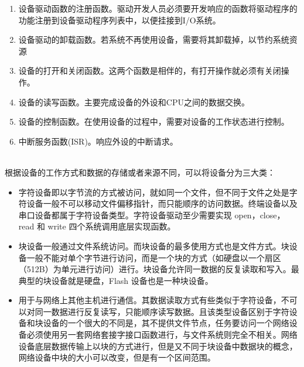 \begin{enumerate}
\item 设备驱动函数的注册函数。驱动开发人员必须要开发响应的函数将驱动程序的功能注册到设备驱动程序列表中，以便挂接到I/O系统。

\item 设备驱动的卸载函数。若系统不再使用设备，需要将其卸载掉，以节约系统资源

\item 设备的打开和关闭函数。这两个函数是相伴的，有打开操作就必须有关闭操作。

\item 设备的读写函数。主要完成设备的外设和CPU之间的数据交换。

\item 设备的控制函数。在使用设备的过程中，需要对设备的工作状态进行控制。

\item 中断服务函数(ISR)。响应外设的中断请求。
\end{enumerate}\\
根据设备的工作方式和数据的存储或者来源不同，可以将设备分为三大类：
\begin{itemize}
\item {}

	字符设备即以字节流的方式被访问，就如同一个文件，但不同于文件之处是字符设备一般不可以移动文件偏移指针，而只能顺序的访问数据。终端设备以及串口设备都属于字符设备类型。字符设备驱动至少需要实现 open，close，read 和 write 四个系统调用底层实现函数。

\item {}

	块设备一般通过文件系统访问。而块设备的最多使用方式也是文件方式。块设备一般不能对单个字节进行访问，而是一个块的方式（如硬盘以一个扇区（512B）为单元进行访问）进行。块设备允许同一数据的反复读取和写入。最典型的块设备就是硬盘，Flash 设备也是一种块设备。
	
\item {}

	用于与网络上其他主机进行通信。其数据读取方式有些类似于字符设备，不可以对同一数据进行反复读写，只能顺序读写数据。且该类型设备区别于字符设备和块设备的一个很大的不同是，其不提供文件节点，任务要访问一个网络设备必须使用另一套网络套接字接口函数进行，与文件系统则完全不相关。网络设备底层数据传输上以块的方式进行，但是又不同于块设备中数据块的概念，网络设备中块的大小可以改变，但是有一个区间范围。
	
\end{itemize}

